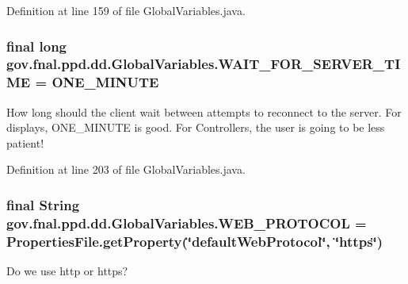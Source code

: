 Definition at line 159 of file Global\-Variables.\-java.

\hypertarget{classgov_1_1fnal_1_1ppd_1_1dd_1_1GlobalVariables_a7ffc604df353f97f39c5c9734c45fb38}{
\subsubsection[{W\-A\-I\-T\-\_\-\-F\-O\-R\-\_\-\-S\-E\-R\-V\-E\-R\-\_\-\-T\-I\-M\-E}]{\setlength{\rightskip}{0pt plus 5cm}final long gov.\-fnal.\-ppd.\-dd.\-Global\-Variables.\-W\-A\-I\-T\-\_\-\-F\-O\-R\-\_\-\-S\-E\-R\-V\-E\-R\-\_\-\-T\-I\-M\-E = {\bf O\-N\-E\-\_\-\-M\-I\-N\-U\-T\-E}\hspace{0.3cm}{\ttfamily [static]}}}\label{classgov_1_1fnal_1_1ppd_1_1dd_1_1GlobalVariables_a7ffc604df353f97f39c5c9734c45fb38}
How long should the client wait between attempts to reconnect to the server. For displays, O\-N\-E\-\_\-\-M\-I\-N\-U\-T\-E is good. For Controllers, the user is going to be less patient! 

Definition at line 203 of file Global\-Variables.\-java.

\hypertarget{classgov_1_1fnal_1_1ppd_1_1dd_1_1GlobalVariables_aa3bf05d555f0c3489c60664ae54a2480}{
\subsubsection[{W\-E\-B\-\_\-\-P\-R\-O\-T\-O\-C\-O\-L}]{\setlength{\rightskip}{0pt plus 5cm}final String gov.\-fnal.\-ppd.\-dd.\-Global\-Variables.\-W\-E\-B\-\_\-\-P\-R\-O\-T\-O\-C\-O\-L = {\bf Properties\-File.\-get\-Property}(\char`\"{}default\-Web\-Protocol\char`\"{}, \char`\"{}https\char`\"{})\hspace{0.3cm}{\ttfamily [static]}}}\label{classgov_1_1fnal_1_1ppd_1_1dd_1_1GlobalVariables_aa3bf05d555f0c3489c60664ae54a2480}
Do we use http or https? 

